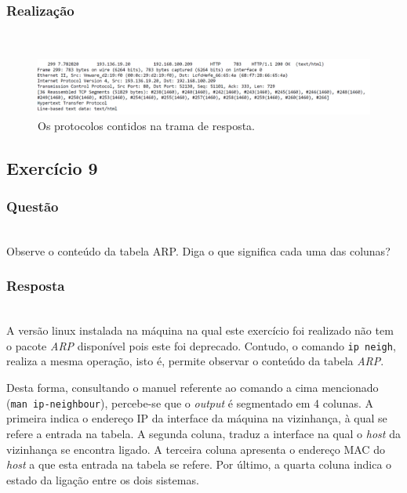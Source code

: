 \documentclass{llncs}
\begin{document}
\subsubsection{Realização}\rule[-10pt]{0pt}{10pt}\\

\begin{figure}
  \begin{center}
  \includegraphics[scale=0.35]{imagens/fields.png} 
  \end{center}
  \caption{Os protocolos contidos na trama de resposta.}
  \label{fig:response_fields}
\end{figure}


\clearpage
\subsection{Exercício 9}
\subsubsection{Questão}\rule[-10pt]{0pt}{10pt}\\

Observe o conteúdo da tabela ARP. Diga o que significa cada uma das colunas?

\subsubsection{Resposta}\rule[-10pt]{0pt}{10pt}\\

A versão linux instalada na máquina na qual este exercício foi realizado não tem o pacote \textit{ARP} disponível pois este foi deprecado. Contudo, o comando \texttt{ip neigh}, realiza a mesma operação, isto é, permite observar o conteúdo da tabela \textit{ARP}.

Desta forma, consultando o manuel referente ao comando a cima mencionado (\texttt{man ip-neighbour}), percebe-se que o \textit{output} é segmentado em 4 colunas. A primeira indica o endereço IP da interface da máquina na vizinhança, à qual se refere a entrada na tabela. A segunda coluna, traduz a interface na qual o \textit{host} da vizinhança se encontra ligado. A terceira coluna apresenta o endereço MAC do \textit{host} a que esta entrada na tabela se refere. Por último, a quarta coluna indica o estado da ligação entre os dois sistemas.
\end{document}
